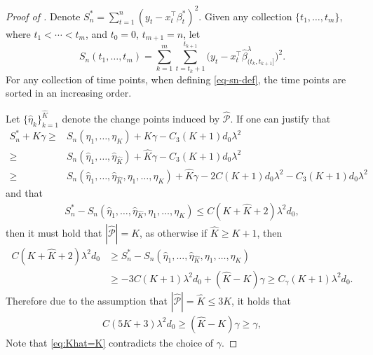 \documentclass[twoside]{article}
\newcommand{\hatp}{ \widehat {\mathcal P}}
\begin{document}
\begin{proof}[Proof of ] 
Denote $S^*_n = \sum_{t=1}^n (y_t - x_t^{\top} \beta^*_t)^2$.  Given any collection $\{t_1, \ldots, t_m\}$, where $t_1 < \cdots < t_m$, and $t_0 = 0$, $t_{m+1} = n$, let 
	\begin{equation}\label{eq-sn-def}
		S_n(t_1, \ldots, t_{m}) = \sum_{k=1}^{m} \sum_{t = t_k +1}^{t_{k+1}} \bigl(y_t -  x_t^{\top}\widehat \beta_{(t_{k}, t_{k+1}]}^\lambda\bigr)^2. 
	\end{equation}
	For any collection of time points, when defining \eqref{eq-sn-def}, the time points are sorted in an increasing order.
	
Let $\{ \widehat \eta_{k}\}_{k=1}^{\widehat K}$ denote the change points induced by $\widehat {\mathcal P}$.  If one can justify that 
	\begin{align}
		S^*_n + K\gamma  \ge  &S_n(\eta_1,\ldots,\eta_K)   + K\gamma - C_3(K+1) d_0 \lambda^2 \label{eq:K consistency step 1} \\ 
		\ge & S_n (\widehat \eta_{1},\ldots, \widehat \eta_{\widehat K } ) +\widehat K \gamma - C_3(K+1) d_0 \lambda^2 \label{eq:K consistency step 2} \\ 
		\ge &   S_n ( \widehat \eta_{1},\ldots, \widehat \eta_{\widehat K } , \eta_1,\ldots,\eta_K ) + \widehat K \gamma  - 2C(K+1)d_0 \lambda^2 - C_3(K+1) d_0 \lambda^2 \label{eq:K consistency step 3}
	\end{align}
	and that 
	\begin{align}\label{eq:K consistency step 4}
		S^*_n  -S_n ( \widehat \eta_{1},\ldots, \widehat \eta_{\widehat K } , \eta_1,\ldots,\eta_K ) \le C (K + \widehat{K} + 2) \lambda^2 d_0,
	\end{align}
	then it must hold that $| \hatp | = K$, as otherwise if $\widehat K \ge K+1 $, then  
	\begin{align*}
		C (K + \widehat{K} + 2) \lambda^2 d_0 & \geq S^*_n  -S_n ( \widehat \eta_{1},\ldots, \widehat \eta_{\widehat K } , \eta_1,\ldots,\eta_K ) \\
		& \geq -3C (K+1) \lambda^2 d_0 + (\widehat K - K)\gamma \geq C_{\gamma} (K+1)\lambda^2 d_0.
	\end{align*} 
	Therefore due to the assumption that $| \hatp|  =\widehat K\le 3K $, it holds that 
	\begin{align} \label{eq:Khat=K} 
		C(5K + 3)\lambda^2d_0  \geq (\widehat K - K)\gamma \geq \gamma,
	\end{align}
	Note that \eqref{eq:Khat=K} contradicts the choice of $\gamma$.


\end{proof}
\end{document}
